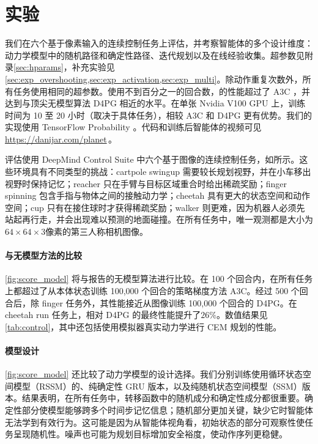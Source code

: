 \section{实验}
\label{sec:control}





我们在六个基于像素输入的连续控制任务上评估\method，并考察智能体的多个设计维度：动力学模型中的随机路径和确定性路径、迭代规划以及在线经验收集。超参数见附录\cref{sec:hparams}，补充实验见\cref{sec:exp_overshooting,sec:exp_activation,sec:exp_multi}。除动作重复次数外，所有任务使用相同的超参数。使用不到百分之一的回合数，\method 的性能超过了 A3C \citep{mnih2016a3c}，并达到与顶尖无模型算法 D4PG \citep{barth2018d4pg} 相近的水平。在单张 Nvidia V100 GPU 上，训练时间为 10 至 20 小时（取决于具体任务），相较 A3C 和 D4PG 更有优势。我们的实现使用 TensorFlow Probability \citep{dillon2017tfd}。代码和训练后智能体的视频可见\,\url{https://danijar.com/planet}\,。

评估使用 DeepMind Control Suite 中六个基于图像的连续控制任务\citep{tassa2018dmcontrol}，如所示。这些环境具有不同类型的挑战：cartpole swingup 需要较长规划视野，并在小车移出视野时保持记忆；reacher 只在手臂与目标区域重合时给出稀疏奖励；finger spinning 包含手指与物体之间的接触动力学；cheetah 具有更大的状态空间和动作空间；cup 只有在接住球时才获得稀疏奖励；walker 则更难，因为机器人必须先站起再行走，并会出现难以预测的地面碰撞。在所有任务中，唯一观测都是大小为$64\times 64\times 3$像素的第三人称相机图像。

\paragraph{与无模型方法的比较}

\cref{fig:score_model} 将\method 与\citet{tassa2018dmcontrol}报告的无模型算法进行比较。在 100 个回合内，\method 在所有任务上都超过了从本体状态训练 100,000 个回合的策略梯度方法 A3C。经过 500 个回合后，除 finger 任务外，其性能接近从图像训练 100,000 个回合的 D4PG。在 cheetah run 任务上，\method 相对 D4PG 的最终性能提升了$26\%$。数值结果见\cref{tab:control}，其中还包括使用模拟器真实动力学进行 CEM 规划的性能。

\paragraph{模型设计}

\cref{fig:score_model} 还比较了动力学模型的设计选择。我们分别训练使用循环状态空间模型（RSSM）的\method、纯确定性 GRU 版本\citep{cho2014gru}，以及纯随机状态空间模型（SSM）版本。结果表明，在所有任务中，转移函数中的随机成分和确定性成分都很重要。确定性部分使模型能够跨多个时间步记忆信息；随机部分更加关键，缺少它时智能体无法学到有效行为。这可能是因为从智能体视角看，初始状态的部分可观察性使任务呈现随机性。噪声也可能为规划目标增加安全裕度，使动作序列更稳健。

